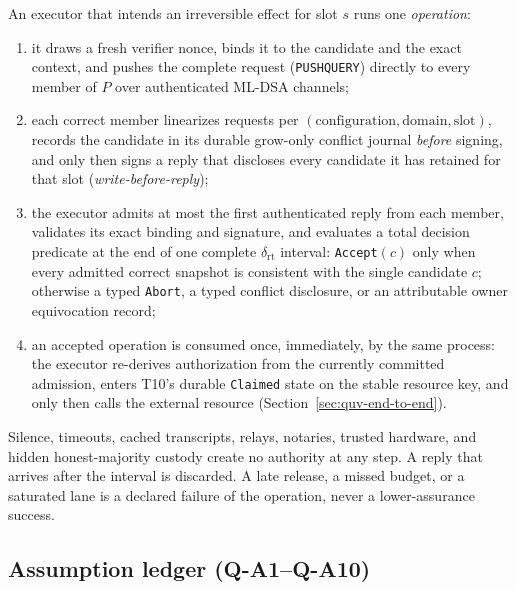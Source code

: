 \documentclass[11pt]{article}
\newcommand{\code}[1]{\texttt{#1}}
\newcommand{\term}[1]{\textit{#1}}
\begin{document}
An executor that intends an irreversible effect for slot \(s\) runs one
\term{operation}:
\begin{enumerate}[leftmargin=1.5em]
\item it draws a fresh verifier nonce, binds it to the candidate and the exact
context, and pushes the complete request (\code{PUSHQUERY}) directly to every
member of \(P\) over authenticated ML-DSA channels;
\item each correct member linearizes requests per
\((\text{configuration},\text{domain},\text{slot})\), records the candidate in
its durable grow-only conflict journal \emph{before} signing, and only then
signs a reply that discloses every candidate it has retained for that slot
(\term{write-before-reply});
\item the executor admits at most the first authenticated reply from each
member, validates its exact binding and signature, and evaluates a total
decision predicate at the end of one complete \(\delta_{\mathrm{rt}}\)
interval: \code{Accept}\((c)\) only when every admitted correct snapshot is
consistent with the single candidate \(c\); otherwise a typed
\code{Abort}, a typed conflict disclosure, or an attributable owner
equivocation record;
\item an accepted operation is consumed once, immediately, by the same
process: the executor re-derives authorization from the currently committed
admission, enters T10's durable \code{Claimed} state on the stable resource
key, and only then calls the external resource
(Section~\ref{sec:quv-end-to-end}).
\end{enumerate}
Silence, timeouts, cached transcripts, relays, notaries, trusted hardware,
and hidden honest-majority custody create no authority at any step. A reply
that arrives after the interval is discarded. A late release, a missed
budget, or a saturated lane is a declared failure of the operation, never a
lower-assurance success.

\subsection{Assumption ledger (Q-A1--Q-A10)}
\label{sec:quv-assumptions}
\end{document}
